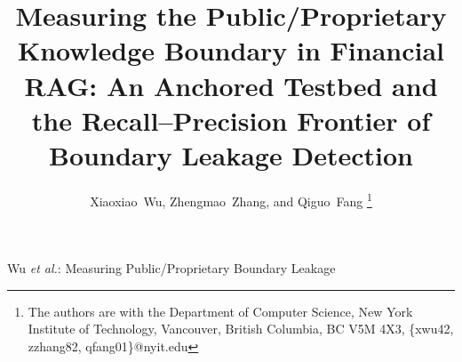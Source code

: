\documentclass[journal]{IEEEtran}
\begin{document}

\title{Measuring the Public/Proprietary Knowledge Boundary in Financial RAG: An Anchored Testbed and the Recall--Precision Frontier of Boundary Leakage Detection}

\author{Xiaoxiao~Wu,
        Zhengmao~Zhang,
        and Qiguo~Fang
\thanks{The authors are with the Department of Computer Science, 
New York Institute of Technology, Vancouver,
British Columbia, BC V5M 4X3, \{xwu42, zzhang82, qfang01\}@nyit.edu}
}

{Wu \MakeLowercase{\textit{et al.}}: Measuring Public/Proprietary Boundary Leakage}
\maketitle
\end{document}

